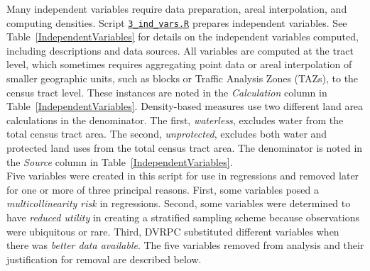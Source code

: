 \documentclass[paper=letterpaper, fontsize=11pt]{scrartcl}
\begin{document}
Many independent variables require data preparation, areal interpolation, and computing densities. Script \href{https://github.com/addisonlarson/ped_counts/blob/master/3_ind_vars.R}{\texttt{3\_ind\_vars.R}} prepares independent variables. See Table~\ref{IndependentVariables} for details on the independent variables computed, including descriptions and data sources. All variables are computed at the tract level, which sometimes requires aggregating point data or areal interpolation of smaller geographic units, such as blocks or Traffic Analysis Zones (TAZs), to the census tract level. These instances are noted in the \textit{Calculation} column in Table~\ref{IndependentVariables}. Density-based measures use two different land area calculations in the denominator. The first, \textit{waterless}, excludes water from the total census tract area. The second, \textit{unprotected}, excludes both water and protected land uses from the total census tract area. The denominator is noted in the \textit{Source} column in Table~\ref{IndependentVariables}. \\

Five variables were created in this script for use in regressions and removed later for one or more of three principal reasons. First, some variables posed a \textit{multicollinearity risk} in regressions. Second, some variables were determined to have \textit{reduced utility} in creating a stratified sampling scheme because observations were ubiquitous or rare. Third, DVRPC substituted different variables when there was \textit{better data available}. The five variables removed from analysis and their justification for removal are described below.
\end{document}

